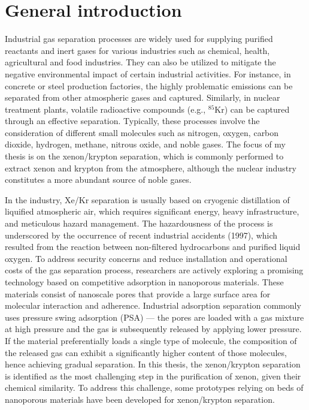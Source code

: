 
\chapter*{General introduction}

Industrial gas separation processes are widely used for supplying purified reactants and inert gases for various industries such as chemical, health, agricultural and food industries. They can also be utilized to mitigate the negative environmental impact of certain industrial activities. For instance, in concrete or steel production factories, the highly problematic  emissions can be separated from other atmospheric gases and captured. Similarly, in nuclear treatment plants, volatile radioactive compounds (e.g., $^{85}$Kr) can be captured through an effective separation. Typically, these processes involve the consideration of different small molecules such as nitrogen, oxygen, carbon dioxide, hydrogen, methane, nitrous oxide, and noble gases. The focus of my thesis is on the xenon/krypton separation, which is commonly performed to extract xenon and krypton from the atmosphere,\autocite{kerry2007industrial} although the nuclear industry constitutes a more abundant source of noble gases.\autocite{Banerjee_2014}

In the industry, Xe/Kr separation is usually based on cryogenic distillation of liquified atmospheric air, which requires significant energy, heavy infrastructure, and meticulous hazard management. The hazardousness of the process is underscored by the occurrence of recent industrial accidents (1997), which resulted from the reaction between non-filtered hydrocarbons and purified liquid oxygen.\autocite{distill_accident,distill_accident2} To address security concerns and reduce installation and operational costs of the gas separation process, researchers are actively exploring a promising technology based on competitive adsorption in nanoporous materials. These materials consist of nanoscale pores that provide a large surface area for molecular interaction and adherence. Industrial adsorption separation commonly uses pressure swing adsorption (PSA) --- the pores are loaded with a gas mixture at high pressure and the gas is subsequently released by applying lower pressure. If the material preferentially loads a single type of molecule, the composition of the released gas can exhibit a significantly higher content of those molecules, hence achieving gradual separation. In this thesis, the xenon/krypton separation is identified as the most challenging step in the purification of xenon, given their chemical similarity. To address this challenge, some prototypes relying on beds of nanoporous materials have been developed for xenon/krypton separation.\autocite{Banerjee2018}

